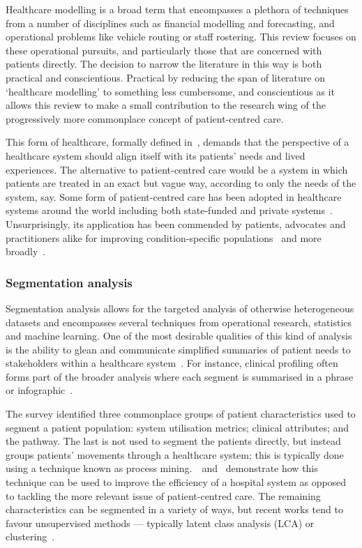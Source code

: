 Healthcare modelling is a broad term that encompasses a plethora of techniques
from a number of disciplines such as financial modelling and forecasting, and
operational problems like vehicle routing or staff rostering. This review
focuses on these operational pursuits, and particularly those that are concerned
with patients directly. The decision to narrow the literature in this way is
both practical and conscientious. Practical by reducing the span of literature
on `healthcare modelling' to something less cumbersome, and conscientious as it
allows this review to make a small contribution to the research wing of the
progressively more commonplace concept of patient-centred care.

This form of healthcare, formally defined in~\cite{Robinson2008}, demands that
the perspective of a healthcare system should align itself with its patients'
needs and lived experiences. The alternative to patient-centred care would be a
system in which patients are treated in an exact but vague way, according to
only the needs of the system, say. Some form of patient-centred care has been
adopted in healthcare systems around the world including both state-funded and
private systems~\cite{DoH2010,Dewi2013,Luxford2011}. Unsurprisingly, its
application has been commended by patients, advocates and practitioners alike
for improving condition-specific
populations~\cite{Foster2019,Gambling2010,Gondek2016,Tsianakas2012} and more
broadly~\cite{IAPO2012,Richards2015,Santana2019}.

\subsubsection{Segmentation analysis}

Segmentation analysis allows for the targeted analysis of otherwise
heterogeneous datasets and encompasses several techniques from operational
research, statistics and machine learning. One of the most desirable qualities
of this kind of analysis is the ability to glean and communicate simplified
summaries of patient needs to stakeholders within a healthcare
system~\cite{Vuik2016b, Yoon2020}. For instance, clinical profiling often forms
part of the broader analysis where each segment is summarised in a phrase or
infographic~\cite{Vuik2016a,Yan2019}.

The survey identified three commonplace groups of patient characteristics used
to segment a patient population: system utilisation metrics; clinical
attributes; and the pathway. The last is not used to segment the patients
directly, but instead groups patients' movements through a healthcare system;
this is typically done using a technique known as process
mining.~\cite{Arnolds2018}~and~\cite{Delias2015} demonstrate how this technique
can be used to improve the efficiency of a hospital system as opposed to
tackling the more relevant issue of patient-centred care. The remaining
characteristics can be segmented in a variety of ways, but recent works tend to
favour unsupervised methods --- typically latent class analysis (LCA) or
clustering~\cite{Yan2018}.

